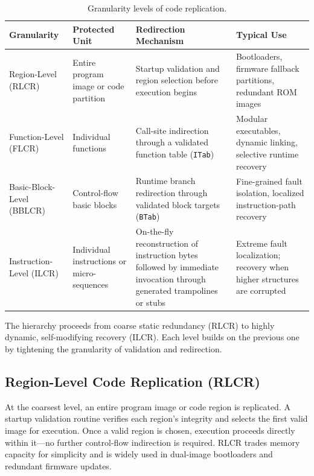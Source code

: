 \begin{table}[t]
  \centering
  \small
  \renewcommand{\arraystretch}{1.15}
  \caption{Granularity levels of code replication.}
  \label{tab:replication-granularity}
  \begin{tabularx}{\linewidth}{@{}l P{3.2cm} Y Y@{}}
    \toprule
    \textbf{Granularity} & \textbf{Protected Unit} &
    \textbf{Redirection Mechanism} & \textbf{Typical Use} \\
    \midrule
    Region-Level (RLCR) &
    Entire program image or code partition &
    Startup validation and region selection before execution begins &
    Bootloaders, firmware fallback partitions, redundant ROM images \\

    Function-Level (FLCR) &
    Individual functions &
    Call-site indirection through a validated function table (\texttt{ITab}) &
    Modular executables, dynamic linking, selective runtime recovery \\

    Basic-Block-Level (BBLCR) &
    Control-flow basic blocks &
    Runtime branch redirection through validated block targets (\texttt{BTab}) &
    Fine-grained fault isolation, localized instruction-path recovery \\

    Instruction-Level (ILCR) &
    Individual instructions or micro-sequences &
    On-the-fly reconstruction of instruction bytes followed by immediate
    invocation through generated trampolines or stubs &
    Extreme fault localization; recovery when higher structures are corrupted \\
    \bottomrule
  \end{tabularx}
\end{table}

The hierarchy proceeds from coarse static redundancy (RLCR) to highly dynamic,
self-modifying recovery (ILCR). Each level builds on the previous one by tightening
the granularity of validation and redirection.

\subsection*{Region-Level Code Replication (RLCR)}
At the coarsest level, an entire program image or code region is replicated.
A startup validation routine verifies each region’s integrity and selects the
first valid image for execution. Once a valid region is chosen, execution
proceeds directly within it—no further control-flow indirection is required.
RLCR trades memory capacity for simplicity and is widely used in dual-image
bootloaders and redundant firmware updates.


